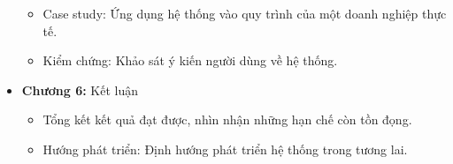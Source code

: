\begin{itemize}
\begin{itemize}
            \item Case study: Ứng dụng hệ thống vào quy trình của một doanh nghiệp thực tế.
            \item Kiểm chứng: Khảo sát ý kiến người dùng về hệ thống.
          \end{itemize}
      \item \textbf{Chương 6:} Kết luận
          \begin{itemize}
            \item Tổng kết kết quả đạt được, nhìn nhận những hạn chế còn tồn đọng.
            \item Hướng phát triển: Định hướng phát triển hệ thống trong tương lai.
          \end{itemize}
\end{itemize}